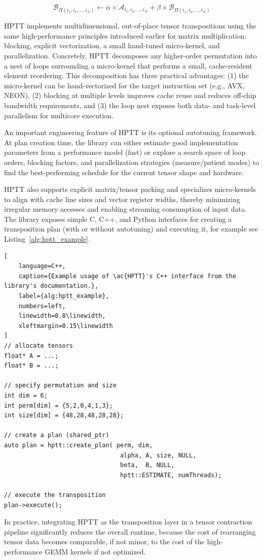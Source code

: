 \begin{equation}
\label{eq:hptt_equation}
\mathcal{B}_{\Pi(i_1,i_2,\dots,i_N)}\leftarrow\alpha\times\mathcal{A}_{i_1,i_2,\dots,i_N}+\beta\times\mathcal{B}_{\Pi(i_1,i_2,\dots,i_N)}
\end{equation}

\ac{HPTT} implements multidimensional, out-of-place tensor transpositions using the same high-performance principles introduced earlier for matrix multiplication: blocking, explicit vectorization, a small hand-tuned micro-kernel, and parallelization. Concretely, \ac{HPTT} decomposes any higher-order permutation into a nest of loops surrounding a micro-kernel that performs a small, cache-resident element reordering. This decomposition has three practical advantages: (1) the micro-kernel can be hand-vectorized for the target instruction set (e.g., AVX, NEON), (2) blocking at multiple levels improves cache reuse and reduces off-chip bandwidth requirements, and (3) the loop nest exposes both data- and task-level parallelism for multicore execution.

An important engineering feature of \ac{HPTT} is its optional autotuning framework. At plan creation time, the library can either estimate good implementation parameters from a performance model (fast) or explore a search space of loop orders, blocking factors, and parallelization strategies (measure/patient modes) to find the best-performing schedule for the current tensor shape and hardware. 

\ac{HPTT} also supports explicit matrix/tensor packing and specializes micro-kernels to align with cache line sizes and vector register widths, thereby minimizing irregular memory accesses and enabling streaming consumption of input data. The library exposes simple C, C++, and Python interfaces for creating a transposition plan (with or without autotuning) and executing it, for example see Listing~\ref{alg:hptt_example}.

\newpage
\begin{lstlisting}[
    language=C++,
    caption={Example usage of \ac{HPTT}'s C++ interface from the library's documentation.},
    label={alg:hptt_example},
    numbers=left,
    linewidth=0.8\linewidth,
    xleftmargin=0.15\linewidth
]
// allocate tensors
float* A = ...;
float* B = ...;

// specify permutation and size
int dim = 6;
int perm[dim] = {5,2,0,4,1,3};
int size[dim] = {48,28,48,28,28};

// create a plan (shared_ptr)
auto plan = hptt::create_plan( perm, dim, 
                                alpha, A, size, NULL, 
                                beta,  B, NULL, 
                                hptt::ESTIMATE, numThreads);
                            
// execute the transposition
plan->execute();
\end{lstlisting}  

In practice, integrating \ac{HPTT} as the transposition layer in a tensor contraction pipeline significantly reduces the overall runtime, because the cost of rearranging tensor data becomes comparable, if not minor, to the cost of the high-performance \ac{GEMM} kernels if not optimized.